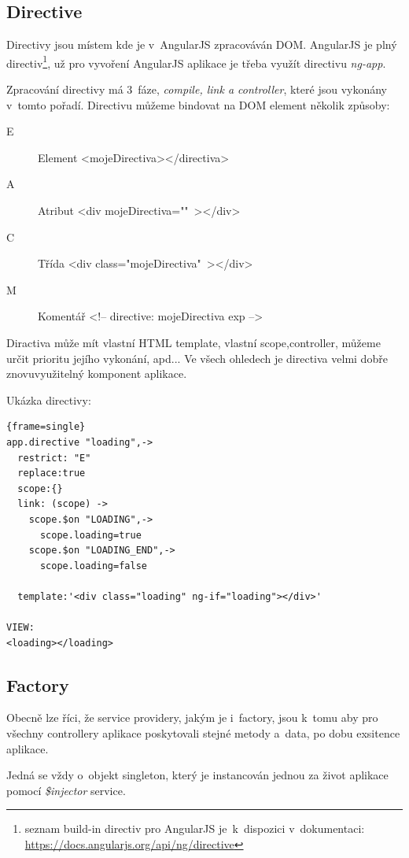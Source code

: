 \documentclass[a4paper,12pt,twoside,BCOR=10mm]{article}
\renewcommand{\it}[1]{\textit{#1}}    %
\newenvironment{codeframe}{%
  \begin{Sbox} 
    \begin{minipage} 
      {\columnwidth-\leftmargin-\rightmargin-2\fboxsep-2\fboxrule-4pt} 
}{%

  \end{minipage} 
  \end{Sbox} 
  \begin{center} 
    \fcolorbox{black}{codeback}{\TheSbox} 
  \end{center} 
}
\begin{document}
\subsection{Directive}
Directivy jsou místem kde je v~AngularJS zpracováván DOM. AngularJS je plný directiv\footnote{seznam build-in directiv pro AngularJS je~k~dispozici v~dokumentaci: \href{https://docs.angularjs.org/api/ng/directive}{https://docs.angularjs.org/api/ng/directive}}, už pro vyvoření AngularJS aplikace je třeba využít directivu \it{ng-app}.

Zpracování directivy má 3~fáze, \it{compile, link a controller}, které jsou vykonány v~tomto pořadí. Directivu můžeme bindovat na DOM element několik způsoby:
\begin{description}
\item[E] Element <mojeDirectiva></directiva>
\item[A] Atribut <div mojeDirectiva=""~></div>
\item[C] Třída <div class="mojeDirectiva"~></div>
\item[M] Komentář <!-- directive: mojeDirectiva exp -->
 \end{description}

 Diractiva může mít vlastní HTML template, vlastní scope,controller, můžeme určit prioritu jejího vykonání, apd... Ve všech ohledech je directiva velmi dobře znovuvyužitelný komponent aplikace.

Ukázka directivy:
     \begin{codeframe} 
      \begin{Verbatim}{frame=single}
app.directive "loading",->
  restrict: "E"
  replace:true
  scope:{}
  link: (scope) ->
    scope.$on "LOADING",->
      scope.loading=true
    scope.$on "LOADING_END",->
      scope.loading=false

  template:'<div class="loading" ng-if="loading"></div>'

VIEW:
<loading></loading>
\end{Verbatim} 
    \end{codeframe}

\subsection{Factory}
Obecně lze říci, že service providery, jakým je i~factory, jsou k~tomu aby pro všechny controllery aplikace poskytovali stejné metody a~data, po dobu exsitence aplikace.

Jedná se vždy o~objekt singleton, který je instancován jednou za život aplikace pomocí \it{\$injector} service.\cite{ngBOOK}
\end{document}
